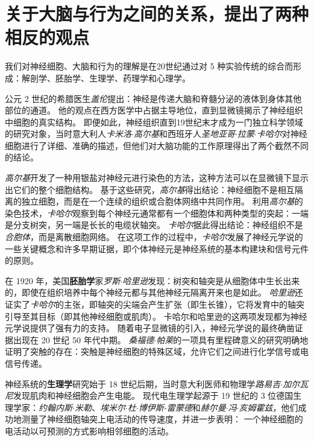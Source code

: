 \section{关于大脑与行为之间的关系，提出了两种相反的观点}

我们对神经细胞、大脑和行为的理解是在20世纪通过对 5 种实验传统的综合而形成：解剖学、胚胎学、生理学、药理学和心理学。


公元 2 世纪的希腊医生\textit{盖伦}提出：神经是传递大脑和脊髓分泌的液体到身体其他部位的通道。
他的观点在西方医学中占据主导地位，直到显微镜揭示了神经组织中细胞的真实结构。
即便如此，神经组织直到19世纪末才成为一门独立科学领域的研究对象，当时意大利人\textit{卡米洛$\cdot$高尔基}和西班牙人\textit{圣地亚哥$\cdot$拉蒙$\cdot$卡哈尔}对神经细胞进行了详细、准确的描述，但他们对大脑功能的工作原理得出了两个截然不同的结论。


\textit{高尔基}开发了一种用银盐对神经元进行染色的方法，这种方法可以在显微镜下显示出它们的整个细胞结构。
基于这些研究，\textit{高尔基}得出结论：神经细胞不是相互隔离的独立细胞，而是在一个连续的组织或合胞体网络中共同作用。
利用\textit{高尔基}的染色技术，\textit{卡哈尔}观察到每个神经元通常都有一个细胞体和两种类型的突起：一端是分支树突，另一端是长长的电缆状轴突。
\textit{卡哈尔}据此得出结论：神经组织不是\textit{合胞体}，而是离散细胞网络。
在这项工作的过程中，\textit{卡哈尔}发展了神经元学说的一些关键概念和许多早期证据，即个体神经元是神经系统的基本构建块和信号元件的原则。


在 1920 年，美国\textbf{胚胎学}家\textit{罗斯$\cdot$哈里逊}发现：树突和轴突是从细胞体中生长出来的，即使在组织培养中每个神经元都与其他神经元隔离开来也是如此。
\textit{哈里逊}还证实了\textit{卡哈尔}的主张，即轴突的尖端会产生扩张（即生长锥），它将发育中的轴突引导至其目标（即其他神经细胞或肌肉）。
卡哈尔和哈里逊的这两项发现都为神经元学说提供了强有力的支持。
随着电子显微镜的引入，神经元学说的最终确凿证据出现在 20 世纪 50 年代中期。
\textit{桑福德$\cdot$帕莱}的一项具有里程碑意义的研究明确地证明了突触的存在：突触是神经细胞的特殊区域，允许它们之间进行化学信号或电信号传递。


神经系统的\textbf{生理学}研究始于 18 世纪后期，当时意大利医师和物理学\textit{路易吉$\cdot$加尔瓦尼}发现肌肉和神经细胞会产生电能。
现代电生理学起源于 19 世纪的 3 位德国生理学家：\textit{约翰内斯$\cdot$米勒}、\textit{埃米尔$\cdot$杜$\cdot$博伊斯-雷蒙德}和\textit{赫尔曼$\cdot$冯$\cdot$亥姆霍兹}，他们成功地测量了神经细胞轴突上电活动的传导速度，并进一步表明：
一个神经细胞的电活动以可预测的方式影响相邻细胞的活动。


